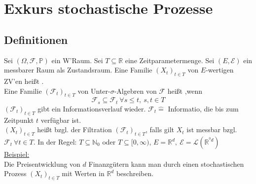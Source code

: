 \section{Exkurs stochastische Prozesse}
\label{sec:stoch_prozesse}

\subsection{Definitionen}
\label{sub:def}
Sei $(\Omega,\mathcal{F},\mathds{P})$ ein W'Raum. Sei $T\subseteq \mathds{R}$ eine Zeitparametermenge. Sei $(E,\mathcal{E})$ ein messbarer Raum als Zustandsraum. Eine Familie $(X_t)_{t \in T}$ von $E$-wertigen ZV'en heißt .\\
Eine Familie $(\mathcal{F}_t)_{t\in T}$ von Unter-$\sigma$-Algebren von $\mathcal{F}$ heißt ,wenn \[\mathcal{F}_s\subseteq \mathcal{F}_t~\forall s\le t,~s,t\in T\]
$(\mathcal{F}_t)_{t\in T}$ gibt ein Informationsverlauf wieder. $\mathcal{F}_t \mathrel{\hat{=}}$ Informatio, die bis zum Zeitpunkt $t$ verfügbar ist.\\
$(X_t)_{t\in T}$ heißt  bzgl. der Filtration $(\mathcal{F}_t)_{t\in T}$, falls gilt $X_t$ ist messbar bzgl. $\mathcal{F}_t~\forall t\in T$. In der Regel: $T\subseteq \mathds{N}_0$ oder $T\subseteq [0,\infty)$, $E=\mathds{R}^d,~\mathcal{E}=\mathcal{L}(\mathds{R}^{^0d})$\\

\uline{Beispiel:}\\
Die Preisentwicklung von $d$ Finanzgütern kann man durch einen stochastischen Prozess $(X_t)_{t\in T}$ mit Werten in $\mathds{R}^d$ beschreiben.


